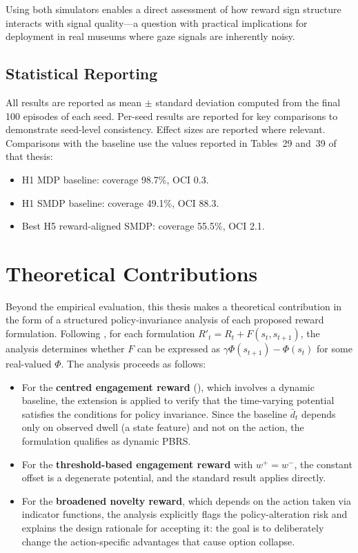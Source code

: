 \documentclass[12pt,a4paper]{article}
\begin{document}
Using both simulators enables a direct assessment of how reward sign structure interacts with signal quality---a question with practical implications for deployment in real museums where gaze signals are inherently noisy.

\subsection{Statistical Reporting}

All results are reported as mean $\pm$ standard deviation computed from the final 100 episodes of each seed. Per-seed results are reported for key comparisons to demonstrate seed-level consistency. Effect sizes are reported where relevant. Comparisons with the \citet{bourdon2025} baseline use the values reported in Tables~29 and~39 of that thesis:
\begin{itemize}[nosep]
    \item H1 MDP baseline: coverage 98.7\%, OCI 0.3.
    \item H1 SMDP baseline: coverage 49.1\%, OCI 88.3.
    \item Best H5 reward-aligned SMDP: coverage 55.5\%, OCI 2.1.
\end{itemize}

\section{Theoretical Contributions}
\label{sec:theory}

Beyond the empirical evaluation, this thesis makes a theoretical contribution in the form of a structured policy-invariance analysis of each proposed reward formulation. Following \citet{ng1999}, for each formulation $R'_t = R_t + F(s_t, s_{t+1})$, the analysis determines whether $F$ can be expressed as $\gamma\Phi(s_{t+1}) - \Phi(s_t)$ for some real-valued $\Phi$. The analysis proceeds as follows:

\begin{itemize}[nosep]
    \item For the \textbf{centred engagement reward} (), which involves a dynamic baseline, the \citet{devlin2012} extension is applied to verify that the time-varying potential satisfies the conditions for policy invariance. Since the baseline $\bar{d}_t$ depends only on observed dwell (a state feature) and not on the action, the formulation qualifies as dynamic PBRS.

    \item For the \textbf{threshold-based engagement reward} with $w^+ = w^-$, the constant offset is a degenerate potential, and the standard \citet{ng1999} result applies directly.

    \item For the \textbf{broadened novelty reward}, which depends on the action taken via indicator functions, the analysis explicitly flags the policy-alteration risk and explains the design rationale for accepting it: the goal is to deliberately change the action-specific advantages that cause option collapse.
\end{itemize}
\end{document}
